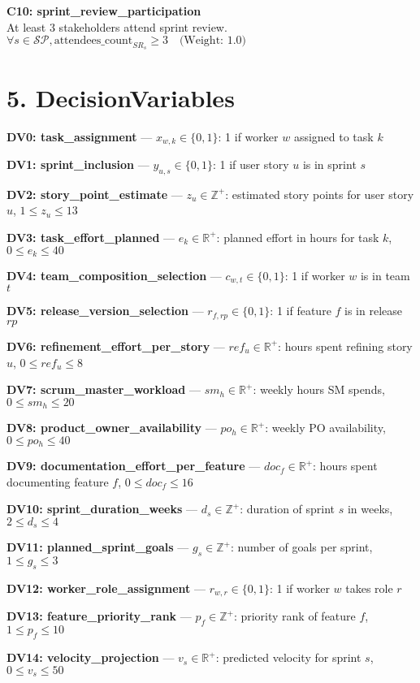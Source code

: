 \documentclass[12pt]{article}
\begin{document}
    \item \textbf{C10: sprint\_review\_participation} \\
    At least 3 stakeholders attend sprint review. \\
    $\forall s \in \mathcal{SP}, \text{attendees\_count}_{SR_s} \geq 3 \quad \text{(Weight: 1.0)}$

\section{5. DecisionVariables}
\item \textbf{DV0: task\_assignment} — $x_{w,k} \in \{0,1\}$: 1 if worker $w$ assigned to task $k$
    \item \textbf{DV1: sprint\_inclusion} — $y_{u,s} \in \{0,1\}$: 1 if user story $u$ is in sprint $s$
    \item \textbf{DV2: story\_point\_estimate} — $z_u \in \mathbb{Z}^+$: estimated story points for user story $u$, $1 \leq z_u \leq 13$
    \item \textbf{DV3: task\_effort\_planned} — $e_k \in \mathbb{R}^+$: planned effort in hours for task $k$, $0 \leq e_k \leq 40$
    \item \textbf{DV4: team\_composition\_selection} — $c_{w,t} \in \{0,1\}$: 1 if worker $w$ is in team $t$
    \item \textbf{DV5: release\_version\_selection} — $r_{f,rp} \in \{0,1\}$: 1 if feature $f$ is in release $rp$
    \item \textbf{DV6: refinement\_effort\_per\_story} — $ref_u \in \mathbb{R}^+$: hours spent refining story $u$, $0 \leq ref_u \leq 8$
    \item \textbf{DV7: scrum\_master\_workload} — $sm_h \in \mathbb{R}^+$: weekly hours SM spends, $0 \leq sm_h \leq 20$
    \item \textbf{DV8: product\_owner\_availability} — $po_h \in \mathbb{R}^+$: weekly PO availability, $0 \leq po_h \leq 40$
    \item \textbf{DV9: documentation\_effort\_per\_feature} — $doc_f \in \mathbb{R}^+$: hours spent documenting feature $f$, $0 \leq doc_f \leq 16$
    \item \textbf{DV10: sprint\_duration\_weeks} — $d_s \in \mathbb{Z}^+$: duration of sprint $s$ in weeks, $2 \leq d_s \leq 4$
    \item \textbf{DV11: planned\_sprint\_goals} — $g_s \in \mathbb{Z}^+$: number of goals per sprint, $1 \leq g_s \leq 3$
    \item \textbf{DV12: worker\_role\_assignment} — $r_{w,r} \in \{0,1\}$: 1 if worker $w$ takes role $r$
    \item \textbf{DV13: feature\_priority\_rank} — $p_f \in \mathbb{Z}^+$: priority rank of feature $f$, $1 \leq p_f \leq 10$
    \item \textbf{DV14: velocity\_projection} — $v_s \in \mathbb{R}^+$: predicted velocity for sprint $s$, $0 \leq v_s \leq 50$
\end{document}
